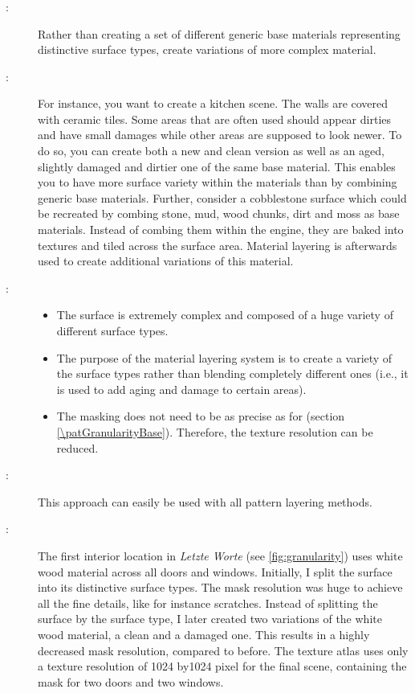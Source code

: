 \subsubsection{\patGranularityVariation}\label{\patGranularityVariation}
\begin{description}
	\item[\patIntent:]%
	Rather than creating a set of different generic base materials representing distinctive surface types, create variations of more complex material. 
	\item[\patMotivation:]%
	For instance, you want to create a kitchen scene. The walls are covered with ceramic tiles. Some areas that are often used should appear dirties and have small damages while other areas are supposed to look newer. To do so, you can create both a new  and clean version as well as an aged, slightly damaged and dirtier one of the same base material. This enables you to have more surface variety within the materials than by combining generic base materials. Further, consider a cobblestone surface which could be recreated by combing stone, mud, wood chunks, dirt and moss as base materials. Instead of combing them within the engine, they are baked into textures and tiled across the surface area. Material layering is afterwards used to create additional variations of this material. 
	\item[\patApplicability:]\hfill
	\begin{itemize}\mynobreakpar
		\item The surface is extremely complex and composed of a huge variety of different surface types.
		\item The purpose of the material layering system is to create a variety of the surface types rather than blending  completely different ones  (i.e., it is used to add aging and damage to certain areas).   
		\item The masking does not need to be as precise as for \emph{\patGranularityBase} (section \ref{\patGranularityBase}). Therefore, the texture resolution can be reduced. 
	\end{itemize}
	\item[\patImplementation:]%
	This approach can easily be used with all pattern layering methods. 
	\item[\patExamples:]%
	The first interior location in \emph{Letzte Worte} (see \ref{fig:granularity}) uses white wood material across all doors and windows. Initially, I split the surface into its distinctive surface types. The mask resolution was huge to achieve all the fine details, like for instance scratches. Instead of splitting the surface by the surface type, I later created two variations of the white wood material, a clean and a damaged one. This results in a highly decreased mask resolution, compared to before. The texture atlas uses only a texture resolution of 1024 by1024 pixel for the final scene, containing the mask for two doors and two windows.

\end{description}
